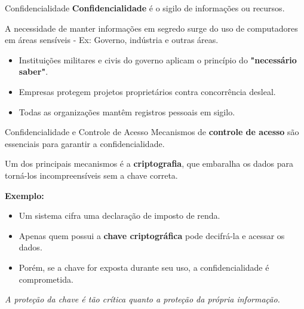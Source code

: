 \begin{frame}{Confidencialidade}
    \textbf{Confidencialidade} é o sigilo de informações ou recursos.

    \vspace{0.4cm}
    A necessidade de manter informações em segredo surge do uso de computadores em áreas sensíveis - Ex: Governo, indústria e outras áreas.

    \vspace{0.4cm}
    \begin{itemize}
        \item Instituições militares e civis do governo aplicam o princípio do \textbf{"necessário saber"}.
        \item Empresas protegem projetos proprietários contra concorrência desleal.
        \item Todas as organizações mantêm registros pessoais em sigilo.
    \end{itemize}
\end{frame}

\begin{frame}{Confidencialidade e Controle de Acesso}
    Mecanismos de \textbf{controle de acesso} são essenciais para garantir a confidencialidade.

    \vspace{0.3cm}
    Um dos principais mecanismos é a \textbf{criptografia}, que embaralha os dados para torná-los incompreensíveis sem a chave correta.

    \vspace{0.3cm}
    \textbf{Exemplo:}
    \begin{itemize}
        \item Um sistema cifra uma declaração de imposto de renda.
        \item Apenas quem possui a \textbf{chave criptográfica} pode decifrá-la e acessar os dados.
        \item Porém, se a chave for exposta durante seu uso, a confidencialidade é comprometida.
    \end{itemize}

    \vspace{0.2cm}
    \textit{A proteção da chave é tão crítica quanto a proteção da própria informação.}
\end{frame}

